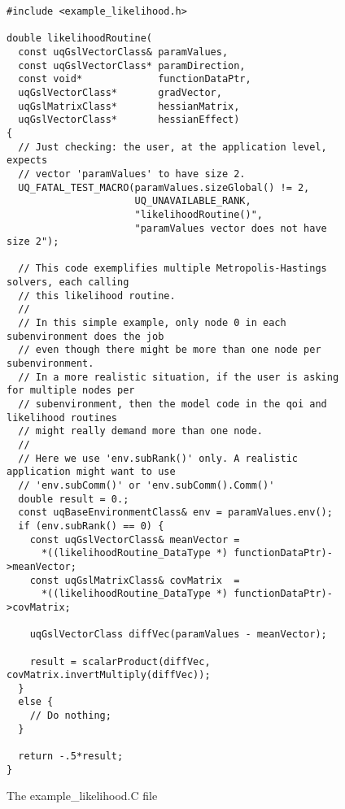 \begin{figure}[h!]
\begin{center}
\begin{verbatim}
#include <example_likelihood.h>

double likelihoodRoutine(
  const uqGslVectorClass& paramValues,
  const uqGslVectorClass* paramDirection,
  const void*             functionDataPtr,
  uqGslVectorClass*       gradVector,
  uqGslMatrixClass*       hessianMatrix,
  uqGslVectorClass*       hessianEffect)
{
  // Just checking: the user, at the application level, expects
  // vector 'paramValues' to have size 2.
  UQ_FATAL_TEST_MACRO(paramValues.sizeGlobal() != 2,
                      UQ_UNAVAILABLE_RANK,
                      "likelihoodRoutine()",
                      "paramValues vector does not have size 2");

  // This code exemplifies multiple Metropolis-Hastings solvers, each calling
  // this likelihood routine.
  //
  // In this simple example, only node 0 in each subenvironment does the job
  // even though there might be more than one node per subenvironment.
  // In a more realistic situation, if the user is asking for multiple nodes per
  // subenvironment, then the model code in the qoi and likelihood routines
  // might really demand more than one node.
  //
  // Here we use 'env.subRank()' only. A realistic application might want to use
  // 'env.subComm()' or 'env.subComm().Comm()'
  double result = 0.;
  const uqBaseEnvironmentClass& env = paramValues.env();
  if (env.subRank() == 0) {
    const uqGslVectorClass& meanVector =
      *((likelihoodRoutine_DataType *) functionDataPtr)->meanVector;
    const uqGslMatrixClass& covMatrix  =
      *((likelihoodRoutine_DataType *) functionDataPtr)->covMatrix;

    uqGslVectorClass diffVec(paramValues - meanVector);

    result = scalarProduct(diffVec, covMatrix.invertMultiply(diffVec));
  }
  else {
    // Do nothing;
  }

  return -.5*result;
}
\end{verbatim}
\end{center}
\caption{
The example\_likelihood.C file
}
\label{fig-like-c}
\end{figure}

